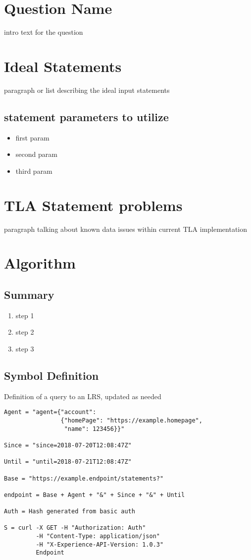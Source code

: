 \documentclass{article}
\begin{document}
\section*{Question Name}
intro text for the question

\section{Ideal Statements}
paragraph or list describing the ideal input statements

\subsection{statement parameters to utilize}

\begin{itemize}
  \item first param
  \item second param
  \item third param
  \end{itemize}

\section{TLA Statement problems}
paragraph talking about known data issues within current TLA implementation

\section{Algorithm}

\subsection{Summary}
\begin{enumerate}
  \item step 1
  \item step 2
  \item step 3
  \end{enumerate}

  \subsection{Symbol Definition}
  Definition of a query to an LRS, updated as needed
  \begin{lstlisting}[frame=single]
Agent = "agent={"account":
                {"homePage": "https://example.homepage",
                 "name": 123456}}"

Since = "since=2018-07-20T12:08:47Z"

Until = "until=2018-07-21T12:08:47Z"

Base = "https://example.endpoint/statements?"

endpoint = Base + Agent + "&" + Since + "&" + Until

Auth = Hash generated from basic auth

S = curl -X GET -H "Authorization: Auth"
         -H "Content-Type: application/json"
         -H "X-Experience-API-Version: 1.0.3"
         Endpoint
  \end{lstlisting}
\end{document}
